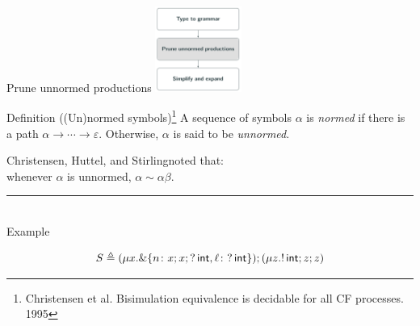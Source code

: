 \message{ !name(main.tex)}\documentclass[10pt]{beamer}
\begin{document}
\begin{frame} {Prune unnormed productions}
	\hfill\includegraphics[height=2.8cm]{img/prune.png}

	\vspace*{-2.8cm}
	\begin{varblock}[7.8cm]{Definition ((Un)normed symbols)\footnote{\label{note1} Christensen et al. Bisimulation equivalence is decidable for all CF processes. 1995} }
			\smallskip 
		A sequence of symbols $\alpha$ is \emph{normed} if there is a path $\alpha \rightarrow \cdots \rightarrow \varepsilon$. 
		Otherwise, $\alpha$ is said to be \emph{unnormed}.\\
	\end{varblock}

	Christensen, Huttel, and Stirling\footnotemark[\value{footnote}] noted that:\\\smallskip
	\hspace*{1cm}	whenever $\alpha$ is unnormed, $\alpha \sim \alpha \beta$.

	\pause
	\vspace*{-1mm}
	{\color{teal}\rule{3cm}{2pt}}\\
   	{\color{teal} Example} \\\smallskip
	\vspace*{-7mm}

	$$S \triangleq (\mu x. \&\{n\colon x;x;?\,\mathsf{int},
      \ell\colon ?\,\mathsf{int} \});( \mu z. !\,\mathsf{int}; z;z )$$


\end{frame}
\end{document}
